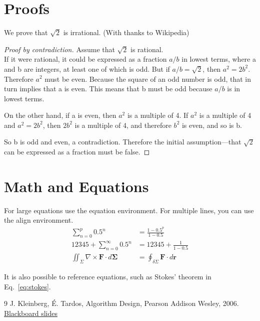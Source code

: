 \documentclass[11pt,twoside,a4paper]{article}
\begin{document}
\section{Proofs}
	We prove that $\sqrt{2}$ is irrational. (With thanks to Wikipedia)
	\begin{proof}[Proof by contradiction]
		Assume that $\sqrt{2}$ is rational.\\
		If it were rational, it could be expressed as a fraction $a/b$ in lowest terms, where a and b are integers, at least one of which is odd. But if $a/b = \sqrt{2}$, then $a^2 = 2b^2$. Therefore $a^2$ must be even. Because the square of an odd number is odd, that in turn implies that a is even. This means that b must be odd because $a/b$ is in lowest terms.

		On the other hand, if a is even, then $a^2$ is a multiple of 4. If $a^2$ is a multiple of 4 and $a^2 = 2b^2$, then $2b^2$ is a multiple of 4, and therefore $b^2$ is even, and so is b.

		So b is odd and even, a contradiction. Therefore the initial assumption—that $\sqrt{2}$ can be expressed as a fraction must be false.
	\end{proof}

\section{Math and Equations}
	For large equations use the equation environment. For multiple lines, you can use the align environment.
	\begin{align}
		\sum_{n=0}^{p} 0.5^n &= \frac{1 - 0.5^p}{1 - 0.5}\\
		12345 + \sum_{n=0}^{\infty} 0.5^n &= 12345 + \frac{1}{1 - 0.5}\\
		\iint_{\Sigma} \nabla \times \textbf{F} \cdot d \boldsymbol{\Sigma}
			&= \oint_{\delta \Sigma} \textbf{F} \cdot d\textbf{r} \label{eq:stokes}
	\end{align}

	It is also possible to reference equations, such as Stokes' theorem in Eq.~\ref{eq:stokes}.

\begin{thebibliography}{9}
J. Kleinberg, \' E. Tardos,
Algorithm Design,
Pearson Addison Wesley,
2006.
\href{https://blackboard.tudelft.nl/webapps/portal/frameset.jsp?tab\_tab\_group\_id=\_10\_1\&url=%2Fwebapps%2Fblackboard%2Fexecute%2Flauncher%3Ftype%3DCourse%26id%3D_45924_1%26url%3D}{Blackboard slides}
\end{thebibliography}
\end{document}
